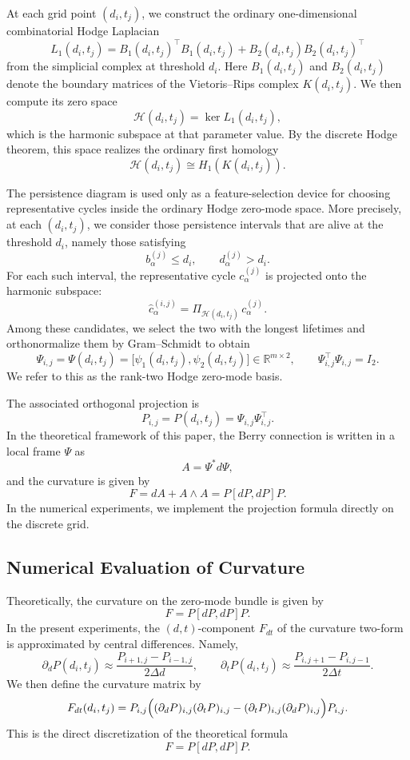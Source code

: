 \documentclass[pdflatex,sn-mathphys-num]{sn-jnl}%
\theoremstyle{thmstyleone}%
\theoremstyle{thmstyletwo}%
\theoremstyle{thmstylethree}%
\begin{document}
\begin{appendices}
At each grid point \((d_i,t_j)\), we construct the ordinary one-dimensional combinatorial Hodge Laplacian
\[
L_1(d_i,t_j)
=
B_1(d_i,t_j)^\top B_1(d_i,t_j)
+
B_2(d_i,t_j) B_2(d_i,t_j)^\top
\]
from the simplicial complex at threshold \(d_i\). Here \(B_1(d_i,t_j)\) and \(B_2(d_i,t_j)\) denote the boundary matrices of the Vietoris--Rips complex \(K(d_i,t_j)\). We then compute its zero space
\[
\mathcal{H}(d_i,t_j)=\ker L_1(d_i,t_j),
\]
which is the harmonic subspace at that parameter value. By the discrete Hodge theorem, this space realizes the ordinary first homology
\[
\mathcal{H}(d_i,t_j)\cong H_1(K(d_i,t_j)).
\]

The persistence diagram is used only as a feature-selection device for choosing representative cycles inside the ordinary Hodge zero-mode space. More precisely, at each \((d_i,t_j)\), we consider those persistence intervals that are alive at the threshold \(d_i\), namely those satisfying
\[
b_\alpha^{(j)}\le d_i,
\qquad
d_\alpha^{(j)}>d_i.
\]
For each such interval, the representative cycle \(c_\alpha^{(j)}\) is projected onto the harmonic subspace:
\[
\widehat{c}_\alpha^{(i,j)}
=
\Pi_{\mathcal H(d_i,t_j)}\,c_\alpha^{(j)}.
\]
Among these candidates, we select the two with the longest lifetimes and orthonormalize them by Gram--Schmidt to obtain
\[
\Psi_{i,j}
=
\Psi(d_i,t_j)
=
\bigl[\psi_1(d_i,t_j),\psi_2(d_i,t_j)\bigr]
\in \mathbb{R}^{m\times 2},
\qquad
\Psi_{i,j}^\top \Psi_{i,j}=I_2.
\]
We refer to this as the rank-two Hodge zero-mode basis.

The associated orthogonal projection is
\[
P_{i,j}
=
P(d_i,t_j)
=
\Psi_{i,j}\Psi_{i,j}^\top.
\]
In the theoretical framework of this paper, the Berry connection is written in a local frame \(\Psi\) as
\[
A=\Psi^\ast d\Psi,
\]
and the curvature is given by
\[
F=dA+A\wedge A=P[dP,dP]P.
\]
In the numerical experiments, we implement the projection formula directly on the discrete grid.

\subsection{Numerical Evaluation of Curvature}

Theoretically, the curvature on the zero-mode bundle is given by
\[
F=P[dP,dP]P.
\]
In the present experiments, the \((d,t)\)-component \(F_{dt}\) of the curvature two-form is approximated by central differences. Namely,
\[
\partial_d P(d_i,t_j)
\approx
\frac{P_{i+1,j}-P_{i-1,j}}{2\Delta d},
\qquad
\partial_t P(d_i,t_j)
\approx
\frac{P_{i,j+1}-P_{i,j-1}}{2\Delta t}.
\]
We then define the curvature matrix by
\[
F_{dt}(d_i,t_j)
=
P_{i,j}
\Bigl(
(\partial_d P)_{i,j}(\partial_t P)_{i,j}
-
(\partial_t P)_{i,j}(\partial_d P)_{i,j}
\Bigr)
P_{i,j}.
\]
This is the direct discretization of the theoretical formula
\[
F=P[dP,dP]P.
\]


\end{appendices}
\end{document}
